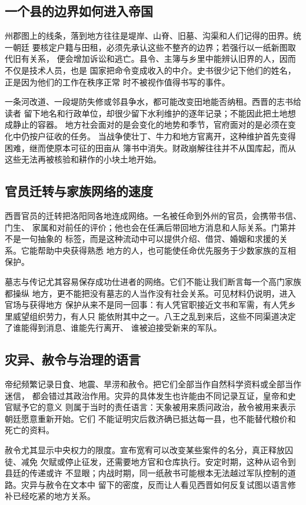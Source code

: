 \subsection{一个县的边界如何进入帝国}

州郡图上的线条，落到地方往往是堤岸、山脊、旧墓、沟渠和人们记得的田界。统一朝廷
要核定户籍与田租，必须先承认这些不整齐的边界；若强行以一纸新图取代旧有关系，
便会增加诉讼和逃亡。县令、主簿与乡里中能辨认旧界的人，因而不仅是技术人员，也是
国家把命令变成收入的中介。史书很少记下他们的姓名，正是因为他们的工作在秩序正常
时不被视作值得书写的事件。

一条河改道、一段堤防失修或邻县争水，都可能改变田地能否纳租。西晋的志书给读者
留下地名和行政单位，却很少留下水利维护的逐年记录；不能因此把土地想成静止的容器。
地方社会面对的是会变化的地势和季节，官府面对的是必须在变化中仍按户征收的任务。
当战争使壮丁、牛力和地方官离开，这种维护首先变得困难，继而使原本可征的田亩从
簿书中消失。财政崩解往往并不从国库起，而从这些无法再被核验和耕作的小块土地开始。

\subsection{官员迁转与家族网络的速度}

西晋官员的迁转把洛阳同各地连成网络。一名被任命到外州的官员，会携带书信、门生、
家属和对前任的评价；他也会在任满后带回地方消息和人际关系。门第并不是一句抽象的
标签，而是这种流动中可以提供介绍、借贷、婚姻和求援的关系。它能帮助中央获得熟悉
地方的人，也可能使任命优先服务于少数家族的互相保护。

墓志与传记尤其容易保存成功仕进者的网络。它们不能让我们断言每一个高门家族都操纵
地方，更不能把没有墓志的人当作没有社会关系。可见材料仍说明，进入官场与获得地方
保护从来不是同一回事：有人凭官职接近文书和军需，有人凭乡里威望组织劳力，有人只
能依附其中之一。八王之乱到来后，这些不同渠道决定了谁能得到消息、谁能先行离开、
谁被迫接受新来的军队。

\subsection{灾异、赦令与治理的语言}

帝纪频繁记录日食、地震、旱涝和赦令。把它们全部当作自然科学资料或全部当作迷信，
都会错过其政治作用。灾异的具体发生也许能由不同记录互证，皇帝和史官赋予它的意义
则属于当时的责任语言：天象被用来质问政治，赦令被用来表示朝廷愿意重新开始。它们
不能证明灾后救济确已抵达每一县，也不能替代粮价和死亡的资料。

赦令尤其显示中央权力的限度。宣布宽宥可以改变某些案件的名分，真正释放囚徒、减免
欠赋或停止征发，还需要地方官和仓库执行。安定时期，这种从诏令到县廷的传递或许
不显眼；内战时期，同一纸赦书可能根本无法越过军队控制的道路。灾异与赦令在文本中
留下的密度，反而让人看见西晋如何反复试图以语言修补已经吃紧的地方关系。

